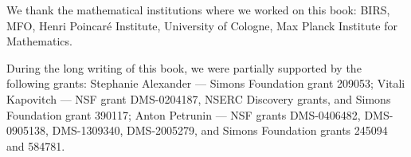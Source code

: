 We thank the mathematical institutions where we worked on this book: 
BIRS, 
MFO, 
Henri Poincar\'{e} Institute,
University of Cologne, 
Max Planck Institute for Mathematics.


During the long writing of this book, we were partially supported by the following grants:
Stephanie Alexander --- 
Simons Foundation grant 209053;
Vitali Kapovitch ---  NSF grant DMS-0204187, NSERC Discovery grants, and Simons Foundation grant 390117;
Anton Petrunin --- 
NSF grants
DMS-0406482,
DMS-0905138,
DMS-1309340,
DMS-2005279,
and Simons Foundation grants 
245094 and 584781.


